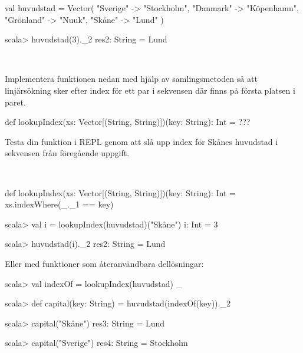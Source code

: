 \SubtaskSolved

\begin{Code}
val huvudstad = Vector(
  "Sverige"  -> "Stockholm",
  "Danmark"  -> "Köpenhamn",
  "Grönland" -> "Nuuk",
  "Skåne"    -> "Lund"
)
\end{Code}

\SubtaskSolved
\begin{REPL}
scala> huvudstad(3)._2
res2: String = Lund
\end{REPL}

\QUESTEND




\QUESTBEGIN

\Task \what~

\Subtask Implementera funktionen  nedan med hjälp av samlingsmetoden  så att linjärsökning sker efter index för ett par i sekvensen där  finns på första platsen i paret.

\begin{Code}
def lookupIndex(xs: Vector[(String, String)])(key: String): Int = ???
\end{Code}

\Subtask Testa din funktion i REPL genom att slå upp index för Skånes huvudstad i sekvensen  från föregående uppgift.

\SOLUTION

\TaskSolved \what~

\SubtaskSolved
\begin{Code}
def lookupIndex(xs: Vector[(String, String)])(key: String): Int =
  xs.indexWhere(_._1 == key)
\end{Code}

\SubtaskSolved
\begin{REPL}
scala> val i = lookupIndex(huvudstad)("Skåne")
i: Int = 3

scala> huvudstad(i)._2
res2: String = Lund
\end{REPL}

\noindent Eller med funktioner som återanvändbara dellösningar:
\begin{REPL}
scala> val indexOf = lookupIndex(huvudstad) _

scala> def capital(key: String) = huvudstad(indexOf(key))._2

scala> capital("Skåne")
res3: String = Lund

scala> capital("Sverige")
res4: String = Stockholm
\end{REPL}

